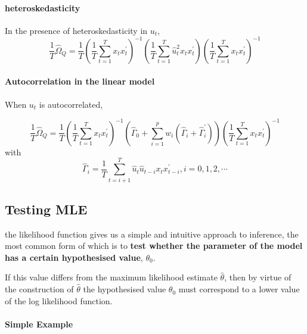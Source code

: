 \documentclass[11pt]{article}
\begin{document}
\paragraph{heteroskedasticity}\mbox{}

In the presence of heteroskedasticity in $u_t$,
\begin{equation}
\frac{1}{T} \widehat{\Omega}_Q=\frac{1}{T}\left(\frac{1}{T} \sum_{t=1}^T x_t x_t^{\prime}\right)^{-1}\left(\frac{1}{T} \sum_{t=1}^T \widehat{u}_t^2 x_t x_t^{\prime}\right)\left(\frac{1}{T} \sum_{t=1}^T x_t x_t^{\prime}\right)^{-1}
\end{equation}

\paragraph{Autocorrelation in the linear model} \mbox{}

When $u_t$ is autocorrelated, 

\begin{equation}
\frac{1}{T} \widehat{\Omega}_Q=\frac{1}{T}\left(\frac{1}{T} \sum_{t=1}^T x_t x_t^{\prime}\right)^{-1}\left(\widehat{\Gamma}_0+\sum_{i=1}^p w_i\left(\widehat{\Gamma}_i+\widehat{\Gamma}_i^{\prime}\right)\right)\left(\frac{1}{T} \sum_{t=1}^T x_t x_t^{\prime}\right)^{-1}
\end{equation}
with 
\begin{equation}
\widehat{\Gamma}_i=\frac{1}{T} \sum_{t=i+1}^T \widehat{u}_t \widehat{u}_{t-i} x_t x_{t-i}^{\prime}, i=0,1,2, \cdots
\end{equation}

\newpage

\subsection{Testing MLE}

the likelihood function gives us a simple and intuitive approach to inference, the most common form of which is to \textbf{test whether the parameter of the model has a certain hypothesised value}, $\theta_0$.

If this value differs from the maximum likelihood estimate $\hat{\theta}$, then by virtue of the construction of $\hat{\theta}$ the hypothesised value $\theta_0$ must correspond to a lower value of the log likelihood function.

\paragraph{Simple Example} \mbox{}
\end{document}

